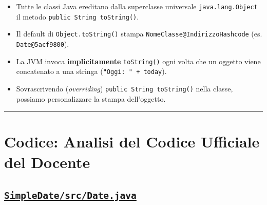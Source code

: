 \documentclass[11pt,a4paper,oneside]{report}
\newcommand{\passthrough}[1]{#1}
\providecommand{\tightlist}{\setlength{\itemsep}{0pt}\setlength{\parskip}{0pt}}
\begin{document}
\begin{itemize}
  \begin{itemize}
  \tightlist
  \item
    Tutte le classi Java ereditano dalla superclasse universale
    \passthrough{\lstinline!java.lang.Object!} il metodo
    \passthrough{\lstinline!public String toString()!}.
  \item
    Il default di \passthrough{\lstinline!Object.toString()!} stampa
    \passthrough{\lstinline!NomeClasse@IndirizzoHashcode!} (es.
    \passthrough{\lstinline!Date@5acf9800!}).
  \item
    La JVM invoca \textbf{implicitamente}
    \passthrough{\lstinline!toString()!} ogni volta che un oggetto viene
    concatenato a una stringa
    (\passthrough{\lstinline!"Oggi: " + today!}).
  \item
    Sovrascrivendo (\emph{overriding})
    \passthrough{\lstinline!public String toString()!} nella classe,
    possiamo personalizzare la stampa dell'oggetto.
  \end{itemize}
\end{itemize}

\begin{center}\rule{0.5\linewidth}{0.5pt}\end{center}

\section{Codice: Analisi del Codice Ufficiale del
Docente}\label{chap05_codice-analisi-del-codice-ufficiale-del-docente}

\subsection{\texorpdfstring{\href{file:///home/wally/Documenti/GitHub/Programmazione-II/25-26/Teoria-e-Esercitazioni/Codice-20260902/Lezioni05-06/SimpleDate/src/Date.java}{\texttt{SimpleDate/src/Date.java}}}{SimpleDate/src/Date.java}}\label{chap05_simpledatesrcdate.java}
\end{document}
